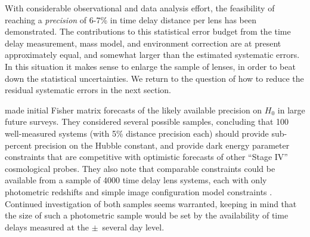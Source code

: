 With considerable observational and data analysis effort, the
feasibility of reaching a {\it precision} of 6-7\% in time delay distance
per lens has been demonstrated. The contributions to this statistical
error budget
from the time delay measurement, mass model, and environment
correction are at present approximately equal, and somewhat larger than
the estimated systematic errors. In this situation it makes sense to
enlarge the sample of lenses, in order to beat down the statistical
uncertainties. We return to the question of how to reduce the residual
systematic errors in the next section.

\citet{C+M09b} made initial Fisher matrix forecasts of the likely
available precision on $H_0$ in large future surveys. They considered
several possible samples, concluding that 100 well-measured systems
(with 5\% distance precision each) should provide sub-percent precision
on the Hubble constant, and provide  dark energy parameter constraints
that are competitive with optimistic forecasts of other ``Stage IV''
cosmological probes. They also note that comparable constraints could be
available from a sample of 4000 time delay lens systems, each with only
photometric redshifts and simple image configuration model constraints
\citep[following][]{Ogu07b}.  Continued investigation of both samples
seems warranted, keeping in mind that the size of such a photometric
sample would be set by the availability of time delays measured at the
$\pm$~several day level.

